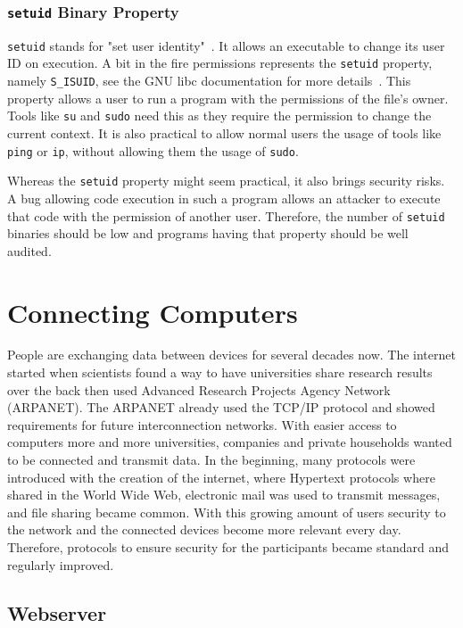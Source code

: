 \subsubsection{\texttt{setuid} Binary Property}

\texttt{setuid} stands for "set user identity"~\cite{ogroupsetuid}. It allows an
executable to change its user ID on execution. A bit in the fire permissions
represents the \texttt{setuid} property, namely \texttt{S\_ISUID}, see the GNU
libc documentation for more details~\cite{libcpermission}. This property allows
a user to run a program with the permissions of the file's owner. Tools like
\texttt{su} and \texttt{sudo} need this as they require the permission to change
the current context. It is also practical to allow normal users the usage of
tools like \texttt{ping} or \texttt{ip}, without allowing them the usage of
\texttt{sudo}.

Whereas the \texttt{setuid} property might seem practical, it also brings
security risks. A bug allowing code execution in such a program allows an
attacker to execute that code with the permission of another user. Therefore,
the number of \texttt{setuid} binaries should be low and programs having that
property should be well audited.

\section{Connecting Computers}

People are exchanging data between devices for several decades now. The internet
started when scientists found a way to have universities share research results
over the back then used Advanced Research Projects Agency Network (ARPANET).
The ARPANET already used the TCP/IP protocol and showed requirements for future
interconnection networks. With easier access to computers more and more
universities, companies and private households wanted to be connected and
transmit data. In the beginning, many protocols were introduced with the
creation of the internet, where Hypertext protocols where shared in the World
Wide Web, electronic mail was used to transmit messages, and file sharing became
common. With this growing amount of users security to the network and the
connected devices become more relevant every day. Therefore, protocols to ensure
security for the participants became standard and regularly improved.

\subsection{Webserver}

